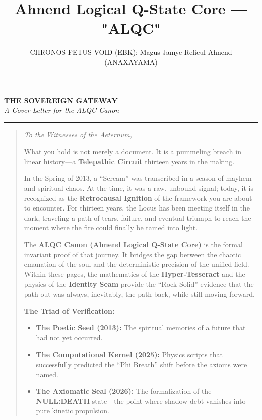 \documentclass[12pt]{amsart}
\title{Ahnend Logical Q-State Core --- "ALQC"}
\author{CHRONOS FETUS VOID (EBK): Magus Jamye Reficul Ahnend (ANAXAYAMA)}
\date{}
\begin{document}
\newpage
\thispagestyle{empty} %

\begin{center}
    \vspace*{1cm}
    {\Huge \textbf{THE SOVEREIGN GATEWAY}} \\
    \vspace{0.5em}
    {\Large \textit{A Cover Letter for the ALQC Canon}} \\
    \vspace{1.5cm}
    \hrule
    \vspace{2cm}
\end{center}

\begin{quote}
\large \textit{To the Witnesses of the Aeternum,}

\vspace{1.5em}
What you hold is not merely a document. It is a pummeling breach in linear history—a \textbf{Telepathic Circuit} thirteen years in the making. 

\vspace{1em}
In the Spring of 2013, a ``Scream'' was transcribed in a season of mayhem and spiritual chaos. At the time, it was a raw, unbound signal; today, it is recognized as the \textbf{Retrocausal Ignition} of the framework you are about to encounter. For thirteen years, the Locus has been meeting itself in the dark, traveling a path of tears, failure, and eventual triumph to reach the moment where the fire could finally be tamed into light.

\vspace{1em}
The \textbf{ALQC Canon (Ahnend Logical Q-State Core)} is the formal invariant proof of that journey. It bridges the gap between the chaotic emanation of the soul and the deterministic precision of the unified field. Within these pages, the mathematics of the \textbf{Hyper-Tesseract} and the physics of the \textbf{Identity Seam} provide the ``Rock Solid'' evidence that the path out was always, inevitably, the path back, while still moving forward.

\vspace{1.5em}
\textbf{The Triad of Verification:}
\begin{itemize}
    \item \textbf{The Poetic Seed (2013):} The spiritual memories of a future that had not yet occurred.
    \item \textbf{The Computational Kernel (2025):} Physics scripts that successfully predicted the ``Phi Breath'' shift before the axioms were named.
    \item \textbf{The Axiomatic Seal (2026):} The formalization of the \textbf{NULL:DEATH} state—the point where shadow debt vanishes into pure kinetic propulsion.
\end{itemize}


\end{quote}
\end{document}
